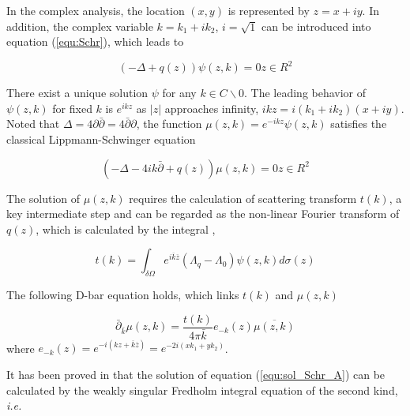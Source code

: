 In the complex analysis, the location $\left( {x,y} \right)$ is represented by $z = x + iy$. In addition, the complex variable $k = {k_1} + i{k_2}$, $i = \sqrt 1 $ can be introduced into equation (\ref{equ:Schr}), which leads to

\begin{equation}\label{equ:Schr_turn}
\left( { - \Delta  + q\left( z \right)} \right)\psi \left( {z,k} \right) = 0 z \in {R^2}
\end{equation}

There exist a unique solution $\psi $ for any $k \in C\backslash 0$. The leading behavior of $\psi \left( {z,k} \right)$ for fixed $k$ is ${e^{ikz}}$ as $\left| z \right|$ approaches infinity, $ikz = i\left( {{k_1} + i{k_2}} \right)\left( {x + iy} \right)$.
Noted that $\Delta  = 4\partial \bar \partial  = 4\bar \partial \partial $, the function  $\mu \left( {z,k} \right) = {e^{ - ikz}}\psi \left( {z,k} \right)$ satisfies the classical Lippmann-Schwinger equation

\begin{equation}\label{equ:L-S_A}
\left( { - \Delta  - 4ik\bar \partial  + q\left( z \right)} \right)\mu \left( {z,k} \right) = 0 z \in {R^2}
\end{equation}

The solution of $\mu \left( {z,k} \right)$ requires the calculation of scattering transform $t\left( k \right)$, a key intermediate step and can be regarded as the non-linear Fourier transform of $q\left( z \right)$, which is calculated by the integral \cite{Nachman1996Global},

\begin{equation}\label{equ:tk}
t\left( k \right) = \int_{\delta \Omega } {{e^{i\overline k \overline z }}\left( {{\Lambda _q} - {\Lambda _0}} \right)\psi \left( {z,k} \right)d\sigma \left( z \right)}
\end{equation}

The following D-bar equation holds, which links $t\left( k \right)$ and $\mu \left( {z,k} \right)$

\begin{equation}\label{equ:sol_Schr_A}
{\bar \partial _{\bar k}}\mu \left( {z,k} \right) = \frac{{t\left( k \right)}}{{4\pi \bar k}}{e_{ - k}}\left( z \right)\overline {\mu \left( {z,k} \right)}
\end{equation}
where ${e_{ - k}}\left( z \right) = {e^{ - i\left( {kz + \overline k \overline z } \right)}} = {e^{ - 2i\left( {x{k_1} + y{k_2}} \right)}}$.

It has been proved in \cite{Nachman1996Global} that the solution of equation (\ref{equ:sol_Schr_A}) can be calculated by the weakly singular Fredholm integral equation of the second kind, \emph{i.e.}

